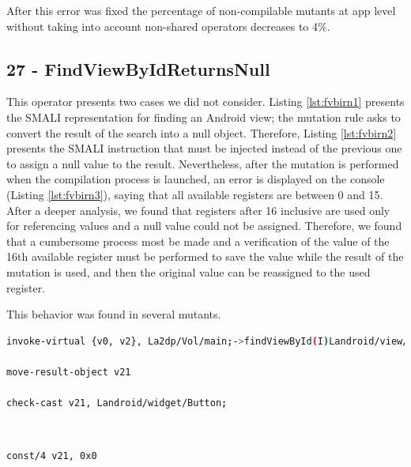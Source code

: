 After this error was fixed the percentage of non-compilable mutants at app level without taking into account non-shared operators decreases to 4\%.

\subsection{27 - FindViewByIdReturnsNull}

This operator presents two cases we did not consider. Listing \ref{lst:fvbirn1} presents the SMALI representation for finding an Android view; the mutation rule asks to convert the result of the search into a null object. Therefore, Listing \ref{lst:fvbirn2} presents the  SMALI instruction that must be injected instead of the previous one to assign a null value to the result. Nevertheless, after the mutation is performed when the compilation process is launched, an error is displayed on the console (Listing \ref{lst:fvbirn3}), saying that all available registers are between 0 and 15. After a deeper analysis, we found that registers after 16 inclusive are used only for referencing values and a null value could not be assigned. Therefore, we found that a cumbersome process most be made and a verification of the value of the 16th available register must be performed to save the value while the result of the mutation is used, and then the original value can be reassigned to the used register.

This behavior was found in several mutants.

\begin{minipage}{\textwidth}
	\begin{lstlisting}[language={sh}, label={lst:fvbirn1}, caption={SMALI representation of findByViewID method call}, numbers=none]
invoke-virtual {v0, v2}, La2dp/Vol/main;->findViewById(I)Landroid/view/View;

move-result-object v21

check-cast v21, Landroid/widget/Button;
	\end{lstlisting}
\end{minipage}\\

\begin{minipage}{\textwidth}
	\begin{lstlisting}[language={sh}, label={lst:fvbirn2}, caption={SMALI representation of a null value being assigned}, numbers=none]
const/4 v21, 0x0
	\end{lstlisting}
\end{minipage}\\

